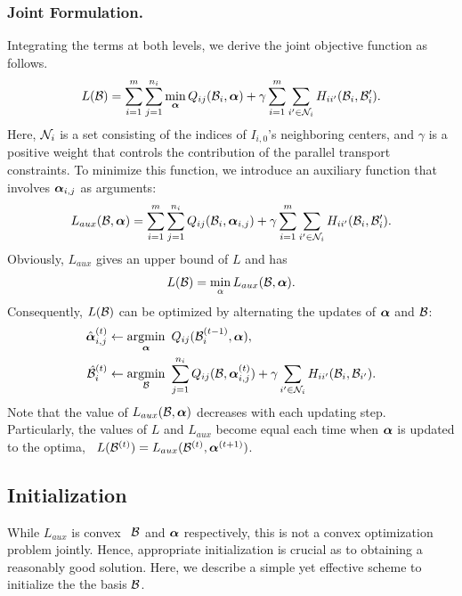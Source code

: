 \subsubsection{Joint Formulation.}
%
Integrating the terms at both levels, we derive the joint objective
function as follows. 
\begin{equation}
    L(\mathcal{B}) =
    \sum_{i=1}^m \sum_{j=1}^{n_i} \min_{\boldsymbol{\alpha}} Q_{ij}(\mathcal{B}_i,
    \boldsymbol{\alpha})
    +
    \gamma \sum_{i=1}^m \sum_{i' \in \mathcal{N}_i} H_{ii'}(\mathcal{B}_i, \mathcal{B}_i').
\end{equation}
Here, $\mathcal{N}_i$ is a set consisting of the indices of $I_{i,0}$'s
neighboring centers, and $\gamma$ is a positive weight that controls
the contribution of the parallel transport constraints.
To minimize this function, we introduce an
auxiliary function that involves $\boldsymbol{\alpha}_{i,j}$ as arguments:
\begin{equation}
    L_{aux}(\mathcal{B}, \boldsymbol{\alpha}) =
    \sum_{i=1}^m \sum_{j=1}^{n_i} Q_{ij}(\mathcal{B}_i,
    \boldsymbol{\alpha}_{i,j})
    +
    \gamma \sum_{i=1}^m \sum_{i' \in \mathcal{N}_i} H_{ii'}(\mathcal{B}_i, \mathcal{B}_i').
\end{equation}
Obviously, $L_{aux}$ gives an upper bound of $L$ and has
\begin{equation}
    L(\mathcal{B}) = \min_{\alpha} L_{aux}(\mathcal{B}, \boldsymbol{\alpha}).
\end{equation}
Consequently, $L(\mathcal{B})$ can be optimized by alternating the updates of
$\boldsymbol{\alpha}$ and $\mathcal{B}$:
\begin{align}
    \hat{\boldsymbol{\alpha}}_{i,j}^{(t)}
    &\leftarrow \mathop{\mathrm{argmin}}_{\boldsymbol{\alpha}} \ Q_{ij}(\mathcal{B}_i^{(t-1)}, \boldsymbol{\alpha}),
    \\
    \hat{\mathcal{B}}_i^{(t)}
    &\leftarrow \mathop{\mathrm{argmin}}_{\mathcal{B}} \
    \sum_{j=1}^{n_i} Q_{ij}(\mathcal{B}, \boldsymbol{\alpha}_{i,j}^{(t)}) +
    \gamma \sum_{i' \in \mathcal{N}_i} H_{ii'}(\mathcal{B}_i, \mathcal{B}_{i'}).
\end{align}
Note that the value of $L_{aux}(\mathcal{B}, \boldsymbol{\alpha})$ decreases with each
updating step. Particularly, the values of $L$ and $L_{aux}$ become
equal each time when $\boldsymbol{\alpha}$ is updated to the optima,
\ie~$L(\mathcal{B}^{(t)}) = L_{aux}(\mathcal{B}^{(t)}, \boldsymbol{\alpha}^{(t+1)})$. 


\subsection{Initialization}

While $L_{aux}$ is convex \wrt~$\mathcal{B}$ and $\boldsymbol{\alpha}$ respectively,
this is not a convex optimization problem jointly. Hence, appropriate
initialization is crucial as to obtaining a reasonably good solution.
Here, we describe a simple yet effective scheme to initialize the
the basis $\mathcal{B}$.

